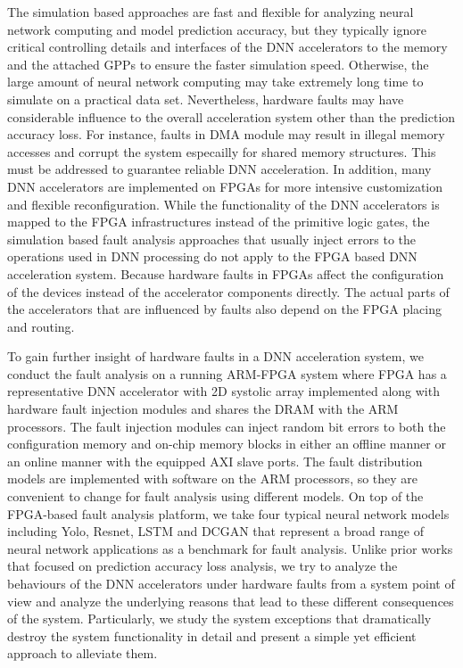 The simulation based approaches are fast and flexible for analyzing 
neural network computing and model prediction accuracy, but they typically 
ignore critical controlling details and interfaces of 
the DNN accelerators to the memory and the attached GPPs to 
ensure the faster simulation speed. Otherwise, the large amount of 
neural network computing may take extremely long time to simulate on 
a practical data set. Nevertheless, hardware faults may have considerable 
influence to the overall acceleration system other than the prediction 
accuracy loss. For instance, faults in DMA 
module may result in illegal memory accesses and corrupt 
the system especailly for shared memory structures.
This must be addressed to guarantee reliable DNN 
acceleration. In addition, many DNN accelerators are implemented on FPGAs for 
more intensive customization and flexible reconfiguration. 
While the functionality of the DNN accelerators is mapped to the 
FPGA infrastructures instead of the primitive logic gates, 
the simulation based fault analysis approaches that usually inject errors to the 
operations used in DNN processing do not apply to the 
FPGA based DNN acceleration system. Because hardware faults 
in FPGAs affect the configuration of the devices instead of the 
accelerator components directly. The actual parts of the 
accelerators that are influenced by faults also depend on 
the FPGA placing and routing. 

To gain further insight of hardware faults in a DNN acceleration system, 
we conduct the fault analysis on a running ARM-FPGA system 
where FPGA has a representative DNN accelerator with 2D systolic array 
implemented along with hardware fault injection modules and shares 
the DRAM with the ARM processors. The fault injection modules can inject
random bit errors to both the configuration memory and on-chip memory 
blocks in either an offline manner or an online manner with the equipped 
AXI slave ports. The fault distribution models are implemented 
with software on the ARM processors, so they are convenient to change for fault 
analysis using different models. On top of the FPGA-based fault 
analysis platform, we take four typical neural network models 
including Yolo, Resnet, LSTM and DCGAN that represent a broad range of 
neural network applications as a benchmark for fault analysis.
Unlike prior works that focused on prediction accuracy loss analysis, 
we try to analyze the behaviours of the DNN accelerators under hardware faults
from a system point of view and analyze the underlying reasons that lead 
to these different consequences of the system. Particularly, we study the 
system exceptions that dramatically destroy the system 
functionality in detail and present a simple yet efficient approach 
to alleviate them.

